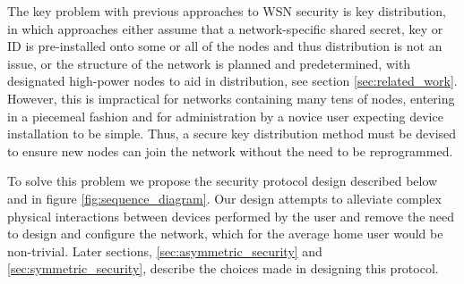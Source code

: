 \documentclass[conference]{./sty/IEEEtran}
\begin{document}
The key problem with previous approaches to WSN security is key distribution, in which approaches either assume that a network-specific shared secret, key or ID is pre-installed onto some or all of the nodes and thus distribution is not an issue, or the structure of the network is planned and predetermined, with designated high-power nodes to aid in distribution, see section \ref{sec:related_work}. However, this is impractical for networks containing many tens of nodes, entering in a piecemeal fashion and for administration by a novice user expecting device installation to be simple. Thus, a secure key distribution method must be devised to ensure new nodes can join the network without the need to be reprogrammed.

To solve this problem we propose the security protocol design described below and in figure \ref{fig:sequence_diagram}. Our design attempts to alleviate complex physical interactions between devices performed by the user\cite{MessageBottle} and remove the need to design and configure the network, which for the average home user would be non-trivial. Later sections, \ref{sec:asymmetric_security} and \ref{sec:symmetric_security}, describe the choices made in designing this protocol.
\end{document}
